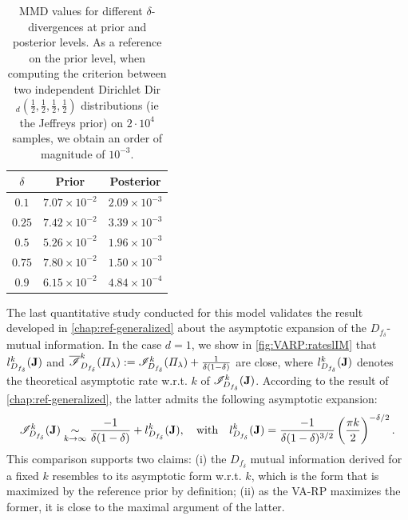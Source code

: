 \begin{table}[h]
\centering
\setlength{\arrayrulewidth}{1.5pt}
\begin{tabular}{|c|c|c|}
\hline
$\delta$ & \textbf{Prior} & \textbf{Posterior}  \\ \hline\hline
$0.1$ & $7.07 \times 10^{-2}$ &  $2.09 \times 10^{-3}$ \\ \hline
$0.25$  & $7.42 \times 10^{-2}$  & $3.39 \times 10^{-3}$  \\ \hline
$0.5$ & $5.26 \times 10^{-2}$ &  $1.96 \times 10^{-3}$   \\ \hline
$0.75$ & $7.80 \times 10^{-2}$ & $1.50 \times 10^{-3}$  \\ \hline 
$0.9$ & $6.15 \times 10^{-2}$ & $4.84 \times 10^{-4}$  \\ \hline 
\end{tabular}
\caption{MMD values for different $\delta$-divergences at prior and posterior levels. As a reference on the prior level, when computing the criterion between two independent Dirichlet Dir$_d(\frac{1}{2},\frac{1}{2},\frac{1}{2},\frac{1}{2})$ distributions (ie the Jeffreys prior) on $2 \cdot 10^4$ samples, we obtain an order of magnitude of $10^{-3}$.}
\label{tab:mmd_multinom}
\end{table}





The last quantitative study conducted for this model validates the result developed in \cref{chap:ref-generalized} about the asymptotic expansion of the $D_{f_\delta}$-mutual information. 
In the case $d=1$, we show in \cref{fig:VARP:rateslIM} that $l_{D_{f_\delta}}^k(\mathbf{J})$ and $\overline{\mathscr{I}}^k_{D_{f_\delta}}(\varPi_\lambda):=\mathscr{I}^k_{D_{f_\delta}}(\varPi_\lambda)+\frac{1}{\delta(1-\delta)}$ are close, where $l^k_{D_{f_\delta}}(\mathbf{J})$ denotes
the theoretical asymptotic rate w.r.t. $k$ of 
$\mathscr{I}^k_{D_{f_\delta}}(\mathbf{J})$. According to the result of \cref{chap:ref-generalized}, the latter admits the following asymptotic expansion:
    \begin{equation}
        \mathscr{I}^k_{D_{f_\delta}}(\mathbf{J}) \underset{k\rightarrow\infty}{\sim} \frac{-1}{\delta(1-\delta)} + l^k_{D_{f_\delta}}(\mathbf{J}), \quad \text{with} \quad l^k_{D_{f_\delta}}(\mathbf{J}) = \frac{-1}{\delta(1-\delta)^{3/2}}\left( \frac{\pi k}{2} \right)^{-\delta/2}.
    \end{equation}
This comparison
supports two claims: (i) the $D_{f_\delta}$ mutual information derived for a fixed $k$ resembles to its asymptotic form w.r.t. $k$, which is the form that is maximized by the reference prior by definition; (ii) as the VA-RP maximizes the former, it is close to the maximal argument of the latter. 


